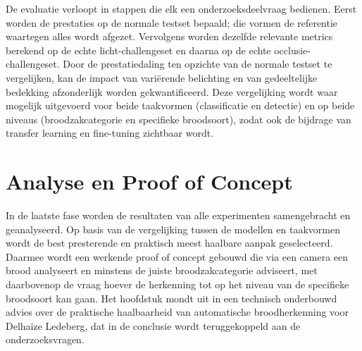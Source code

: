 De evaluatie verloopt in stappen die elk een onderzoeksdeelvraag bedienen. Eerst
worden de prestaties op de normale testset bepaald; die vormen de referentie waartegen
alles wordt afgezet. Vervolgens worden dezelfde relevante metrics berekend op de echte
licht-challengeset en daarna op de echte occlusie-challengeset. Door de prestatiedaling
ten opzichte van de normale testset te vergelijken, kan de impact van variërende
belichting en van gedeeltelijke bedekking afzonderlijk worden gekwantificeerd. Deze
vergelijking wordt waar mogelijk uitgevoerd voor beide taakvormen (classificatie en
detectie) en op beide niveaus (broodzakcategorie en specifieke broodsoort), zodat ook
de bijdrage van transfer learning en fine-tuning zichtbaar wordt.

\section{Analyse en Proof of Concept}

In de laatste fase worden de resultaten van alle experimenten samengebracht en
geanalyseerd. Op basis van de vergelijking tussen de modellen en taakvormen wordt de
best presterende en praktisch meest haalbare aanpak geselecteerd. Daarmee wordt een
werkende proof of concept gebouwd die via een camera een brood analyseert en minstens
de juiste broodzakcategorie adviseert, met daarbovenop de vraag hoever de herkenning
tot op het niveau van de specifieke broodsoort kan gaan. Het hoofdstuk mondt uit in een
technisch onderbouwd advies over de praktische haalbaarheid van automatische
broodherkenning voor Delhaize Ledeberg, dat in de conclusie wordt teruggekoppeld aan
de onderzoeksvragen.